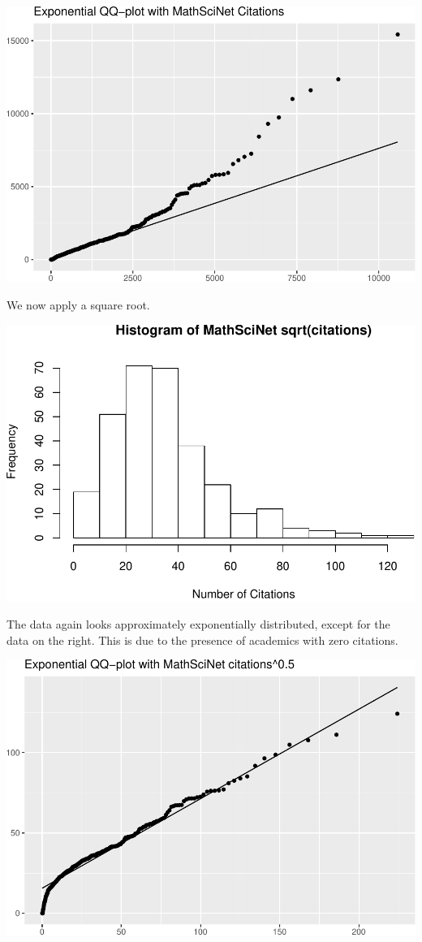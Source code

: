 \documentclass[]{article}
\begin{document}
\includegraphics{final_files/figure-latex/unnamed-chunk-12-1.pdf}

We now apply a square root.

\includegraphics{final_files/figure-latex/unnamed-chunk-13-1.pdf}

The data again looks approximately exponentially distributed, except for
the data on the right. This is due to the presence of academics with
zero citations.

\includegraphics{final_files/figure-latex/unnamed-chunk-14-1.pdf}
\end{document}

